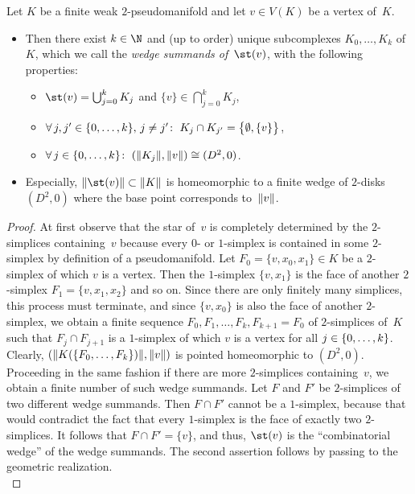 \begin{thProposition}
    \label{ch4:starinpmfd}
    Let $K$ be a finite weak $2$-pseudo\-manifold and let $v\in V(K)$ be a vertex
    of~$K$.
    \begin{itemize}
        \item
            Then there exist $k\in\N$ and (up to order) unique subcomplexes
            $K_0,\dots,K_k$ of~$K$, which we call the \emph{wedge summands
            of~$\st(v)$}, with the following properties:
            \begin{itemize}[labelsep=3mm,leftmargin=!]
                \item
                    $\st(v) = \bigcup_{j=0}^k K_j$
                    and $\{v\} \in \bigcap_{j=0}^k K_j$,
                \item
                    $\forall\,j,j'\in\{0,\ldots,k\},\,j\neq j'\colon\;
                    K_j\cap K_{j'} = \bigl\{\emptyset, \{v\}\bigr\}$,
                \item
                    $\forall\,j\in\{0,\ldots,k\}\colon\;
                    (\lVert K_j\rVert,\lVert v\rVert) \cong (D^2,0)$.
            \end{itemize}
            
        \item
            Especially, $\geom{\st(v)}\subset\geom{K}$ is homeomorphic to a
            finite wedge of $2$-disks~$(D^2,0)$ where the base point corresponds
            to~$\lVert v\rVert$.
    \end{itemize}
\end{thProposition}

\begin{proof}
    At first observe that the star of~$v$ is completely determined by the
    $2$-simplices containing~$v$ because every $0$- or $1$-simplex is
    contained in some $2$-simplex by definition of a pseudomanifold.
    Let $F_0=\{v,x_0,x_1\}\in K$ be a
    $2$-simplex of which $v$ is a vertex. Then the $1$-simplex
    $\{v,x_1\}$ is the face of another $2$-simplex $F_1=\{v,x_1,x_2\}$
    and so on. Since there are only finitely many simplices, this process
    must terminate, and since $\{v,x_0\}$ is also the face of another
    $2$-simplex, we obtain a finite sequence $F_0,F_1,\dots,F_k,F_{k+1}=F_0$
    of $2$-simplices of~$K$ such that $F_j\cap F_{j+1}$ is a $1$-simplex
    of which $v$ is a vertex for all $j\in\{0,\ldots,k\}$. %
    Clearly, $(\lVert K(\{F_0,\dots,F_k\})\rVert,\lVert v\rVert)$ is pointed
    homeomorphic to $(D^2,0)$. Proceeding in the same fashion if there are more
    $2$-simplices containing~$v$, we obtain a finite number of such wedge
    summands.
    Let $F$ and $F'$ be $2$-simplices of two different wedge summands.
    Then $F\cap F'$ cannot be a $1$-simplex, because that would contradict
    the fact that every $1$-simplex is the face of exactly two $2$-simplices.
    It follows that $F\cap F' = \{v\}$, and thus, $\st(v)$ is the
    \enquote{combinatorial wedge} of the wedge summands. The second assertion
    follows by passing to the geometric realization.
    \\
\end{proof}

